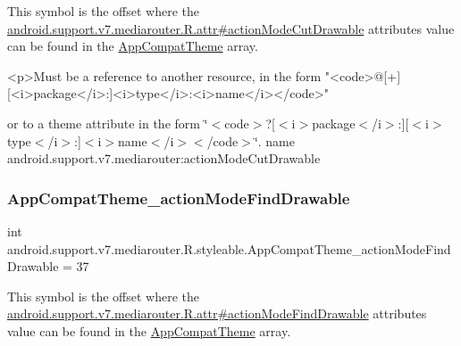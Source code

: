 This symbol is the offset where the \hyperlink{classandroid_1_1support_1_1v7_1_1mediarouter_1_1R_1_1attr_a6fb4fd45ab39f21302d7519c4f8d3aa1}{android.\+support.\+v7.\+mediarouter.\+R.\+attr\#action\+Mode\+Cut\+Drawable} attribute\textquotesingle{}s value can be found in the \hyperlink{classandroid_1_1support_1_1v7_1_1mediarouter_1_1R_1_1styleable_a4e3d3900c75d49aeb2f283cac00214d6}{App\+Compat\+Theme} array.

\begin{DoxyVerb}      <p>Must be a reference to another resource, in the form "<code>@[+][<i>package</i>:]<i>type</i>:<i>name</i></code>"
\end{DoxyVerb}
 or to a theme attribute in the form \char`\"{}$<$code$>$?\mbox{[}$<$i$>$package$<$/i$>$\+:\mbox{]}\mbox{[}$<$i$>$type$<$/i$>$\+:\mbox{]}$<$i$>$name$<$/i$>$$<$/code$>$\char`\"{}.  name android.\+support.\+v7.\+mediarouter\+:action\+Mode\+Cut\+Drawable \mbox{\label{classandroid_1_1support_1_1v7_1_1mediarouter_1_1R_1_1styleable_a247a1523628d74f978947c8ee5b64026}} 
\subsubsection{\texorpdfstring{App\+Compat\+Theme\+\_\+action\+Mode\+Find\+Drawable}{AppCompatTheme\_actionModeFindDrawable}}
{\footnotesize\ttfamily int android.\+support.\+v7.\+mediarouter.\+R.\+styleable.\+App\+Compat\+Theme\+\_\+action\+Mode\+Find\+Drawable = 37\hspace{0.3cm}{\ttfamily [static]}}

This symbol is the offset where the \hyperlink{classandroid_1_1support_1_1v7_1_1mediarouter_1_1R_1_1attr_a24c23910e12c30a8b0baf645cf3b21e5}{android.\+support.\+v7.\+mediarouter.\+R.\+attr\#action\+Mode\+Find\+Drawable} attribute\textquotesingle{}s value can be found in the \hyperlink{classandroid_1_1support_1_1v7_1_1mediarouter_1_1R_1_1styleable_a4e3d3900c75d49aeb2f283cac00214d6}{App\+Compat\+Theme} array.

